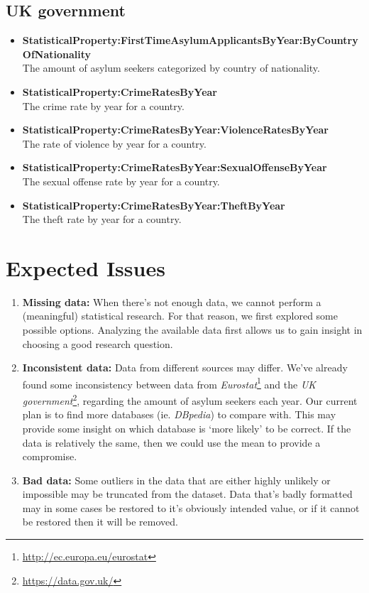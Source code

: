 \documentclass[a4paper,10pt]{article}
\begin{document}
\subsection{UK government}

\begin{itemize}
	\item \textbf{StatisticalProperty:FirstTimeAsylumApplicantsByYear:ByCountryOfNationality}\\
	The amount of asylum seekers categorized by country of nationality.
	\item \textbf{StatisticalProperty:CrimeRatesByYear}\\
	The crime rate by year for a country.
	\item \textbf{StatisticalProperty:CrimeRatesByYear:ViolenceRatesByYear}\\
	The rate of violence by year for a country.
	\item \textbf{StatisticalProperty:CrimeRatesByYear:SexualOffenseByYear}\\
	The sexual offense rate by year for a country.
	\item \textbf{StatisticalProperty:CrimeRatesByYear:TheftByYear}\\
	The theft rate by year for a country.
\end{itemize}

\section{Expected Issues}

\begin{enumerate}
	\item \textbf{Missing data:} When there's not enough data, we cannot perform a (meaningful) statistical research. For that reason, we first explored some possible options. Analyzing the available data first allows us to gain insight in choosing a good research question.
	\item \textbf{Inconsistent data:} Data from different sources may differ. We've already found some inconsistency between data from \textit{Eurostat}\footnote{\url{http://ec.europa.eu/eurostat}} and the \textit{UK government}\footnote{\url{https://data.gov.uk/}}, regarding the amount of asylum seekers each year. Our current plan is to find more databases (ie. \textit{DBpedia}) to compare with. This may provide some insight on which database is `more likely' to be correct. If the data is relatively the same, then we could use the mean to provide a compromise.
	\item \textbf{Bad data:} Some outliers in the data that are either highly unlikely or impossible may be truncated from the dataset. Data that's badly formatted may in some cases be restored to it's obviously intended value, or if it cannot be restored then it will be removed.
\end{enumerate}
\end{document}
